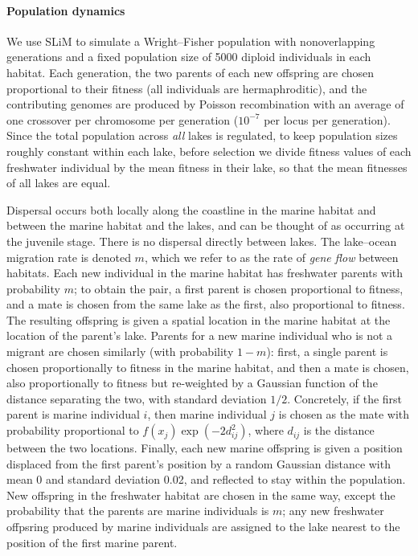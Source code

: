 \documentclass{article}
\begin{document}
\paragraph{Population dynamics}
We use SLiM to simulate a Wright--Fisher population with nonoverlapping generations 
and a fixed population size of 5000 diploid individuals in each habitat.
Each generation, the two parents of each new offspring are chosen proportional to their fitness 
(all individuals are hermaphroditic),
and the contributing genomes are produced by Poisson recombination 
with an average of one crossover per chromosome per generation 
($10^{-7}$ per locus per generation). 
Since the total population across \emph{all} lakes is regulated,
to keep population sizes roughly constant within each lake, 
before selection we divide fitness values of each freshwater individual 
by the mean fitness in their lake,
so that the mean fitnesses of all lakes are equal.

Dispersal occurs both locally along the coastline in the marine habitat 
and between the marine habitat and the lakes, and can be thought of as occurring at the juvenile stage. 
There is no dispersal directly between lakes.
The lake--ocean migration rate is denoted $m$, 
which we refer to as the rate of \emph{gene flow} between habitats.
Each new individual in the marine habitat has freshwater parents with probability $m$; 
to obtain the pair, a first parent is chosen proportional to fitness, and a mate is chosen from the same lake as the first, also proportional to fitness. 
The resulting offspring is given a spatial location in the marine habitat at the location of the parent's lake. 
Parents for a new marine individual who is not a migrant are chosen similarly (with probability $1-m$): 
first, a single parent is chosen proportionally to fitness in the marine habitat,
and then a mate is chosen, also proportionally to fitness but re-weighted by a Gaussian function of the distance separating the two, with standard deviation $1/2$. 
Concretely, if the first parent is marine individual $i$, then marine individual $j$ is chosen as the mate with probability proportional to $f(x_j) \exp(-2d_{ij}^2)$,
where $d_{ij}$ is the distance between the two locations. 
Finally, each new marine offspring is given a position displaced from the first parent's position by a random Gaussian distance with mean 0 and standard deviation 0.02, 
and reflected to stay within the population.
New offspring in the freshwater habitat are chosen in the same way, except the probability that the parents are marine individuals is $m$; 
any new freshwater offpsring produced by marine individuals are assigned to the lake nearest to the position of the first marine parent.
\end{document}
